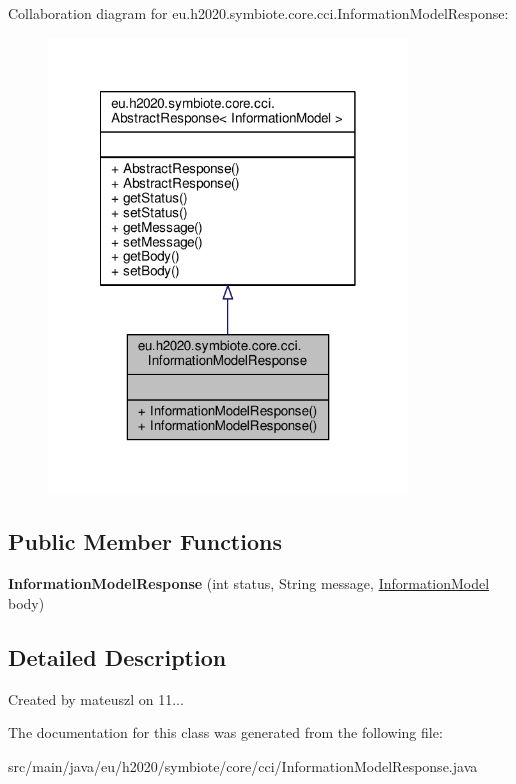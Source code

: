 Collaboration diagram for eu.\+h2020.\+symbiote.\+core.\+cci.\+Information\+Model\+Response\+:
\nopagebreak
\begin{figure}[H]
\begin{center}
\leavevmode
\includegraphics[width=270pt]{classeu_1_1h2020_1_1symbiote_1_1core_1_1cci_1_1InformationModelResponse__coll__graph}
\end{center}
\end{figure}
\subsection*{Public Member Functions}
\begin{DoxyCompactItemize}
\item 
\mbox{\label{classeu_1_1h2020_1_1symbiote_1_1core_1_1cci_1_1InformationModelResponse_a8f66ee2c240126780a1a596199e7f965}} 
{\bfseries Information\+Model\+Response} (int status, String message, \hyperlink{classeu_1_1h2020_1_1symbiote_1_1model_1_1mim_1_1InformationModel}{Information\+Model} body)
\end{DoxyCompactItemize}


\subsection{Detailed Description}
Created by mateuszl on 11... 

The documentation for this class was generated from the following file\+:\begin{DoxyCompactItemize}
\item 
src/main/java/eu/h2020/symbiote/core/cci/Information\+Model\+Response.\+java\end{DoxyCompactItemize}

